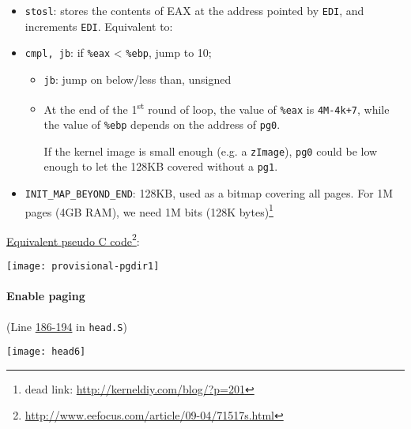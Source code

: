 \begin{itemize}
\begin{description}
  \end{description}
\item \texttt{stosl}: stores the contents of EAX at the address pointed by \texttt{EDI},
  and increments \texttt{EDI}. Equivalent to:
  \begin{center}
  \end{center}
\item \texttt{cmpl, jb}: if \texttt{\%eax} < \texttt{\%ebp}, jump to 10;
  \begin{itemize}
  \item \texttt{jb}: jump on below/less than, unsigned 
  \item At the end of the 1\textsuperscript{st} round of loop, the value of \texttt{\%eax}
    is \texttt{4M-4k+7}, while the value of \texttt{\%ebp} depends on the address of
    \texttt{pg0}.
    
    If the kernel image is small enough (e.g. a \texttt{zImage}), \texttt{pg0} could be
    low enough to let the 128KB covered without a \texttt{pg1}.
  \end{itemize}
\item \texttt{INIT\_MAP\_BEYOND\_END}: 128KB, used as a bitmap covering all pages. For
  1M pages (4GB RAM), we need 1M bits (128K
  bytes)\footnote{dead link: \url{http://kerneldiy.com/blog/?p=201}}
\end{itemize}

\href{http://www.eefocus.com/article/09-04/71517s.html}{Equivalent pseudo C code}\footnote{\url{http://www.eefocus.com/article/09-04/71517s.html}}:

\begin{center}
  \texttt{[image: provisional-pgdir1]}
\end{center}

\paragraph{Enable paging}

 (Line
\href{http://lxr.linux.no/linux+v2.6.11/arch/i386/kernel/head.S\#L186}{186-194} in
\texttt{head.S})

\begin{center}
  \texttt{[image: head6]}
\end{center}
    
